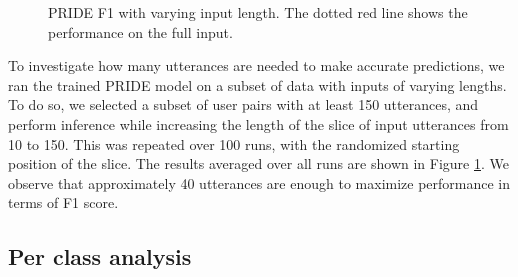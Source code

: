 \begin{figure}[t!]
\centering
{}
\caption[PRIDE F1 with varying input length.]{PRIDE F1 with varying input length. The dotted red line shows the performance on the full input.}
\label{increasing}
\end{figure}

To investigate how many utterances are needed to make accurate predictions, we ran the trained PRIDE model on a subset of data with inputs of varying lengths.
To do so, we selected a subset of user pairs with at least 150 utterances, and perform inference while increasing the length of the slice of input utterances from 10 to 150.
This was repeated over 100 runs, with the randomized starting position of the slice.
The results averaged over all runs are shown in Figure \ref{increasing}.
We observe that approximately 40 utterances are enough to maximize performance in terms of F1 score.

\subsection{Per class analysis}

